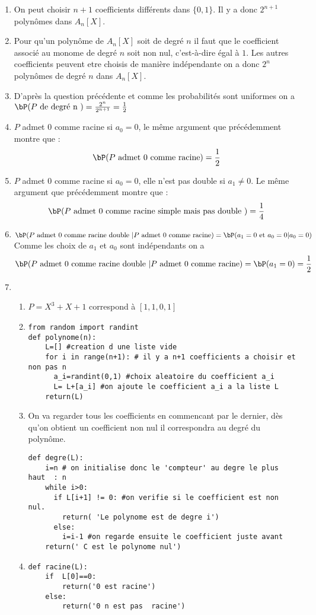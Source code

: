 \begin{correction}
\begin{enumerate}
\item On peut choisir $n+1$ coefficients différents dans $\{0,1\}$. Il y a donc $2^{n+1}$ polynômes dans $A_n[X]$. 
\item Pour qu'un polynôme de $A_n[X]$ soit de degré $n$ il faut que le coefficient associé au monome de degré $n$ soit non nul, c'est-à-dire égal à $1$. Les autres coefficients peuvent etre choisis de manière indépendante on a donc $2^n$  polynômes de degré $n$ dans $A_n[X]$. 
\item D'après la question précédente et comme les probabilités sont uniformes on a $\bP( \text{$ P$ de degré n }) =\frac{2^n}{2^{n+1}} =\frac{1}{2}$
\item $P$ admet $0$ comme racine si $a_0=0$, le même argument que précédemment montre que :
$$\bP( \text{$ P$ admet 0 comme racine}) = \frac{1}{2}$$

\item $P$ admet $0$ comme racine si $a_0=0$, elle n'est pas double si $a_1\neq 0$. Le même argument que précédemment montre que :
$$\bP( \text{$ P$ admet 0 comme racine simple mais pas double }) = \frac{1}{4}$$
\item $\bP( \text{$ P$ admet 0 comme racine  double } | \text{$ P$ admet 0 comme racine}  )  = \bP (a_1= 0 \text{ et } a_0 =0 | a_0 =0 ) $ Comme les choix de $a_1$ et $a_0$ sont indépendants on a 
$$\bP( \text{$ P$ admet 0 comme racine  double } | \text{$ P$ admet 0 comme racine}  )   =\bP (a_1= 0 ) =\frac{1}{2}$$
\item 
\begin{enumerate}
\item $P=X^3+X+1$ correspond à $[1,1,0,1]$
\item 
\begin{lstlisting}
from random import randint
def polynome(n):
	L=[] #creation d une liste vide
	for i in range(n+1): # il y a n+1 coefficients a choisir et non pas n 
	  a_i=randint(0,1) #choix aleatoire du coefficient a_i
	  L= L+[a_i] #on ajoute le coefficient a_i a la liste L
	return(L)		  
\end{lstlisting}
\item 
On va regarder tous les coefficients en commencant par le dernier, dès qu'on obtient un coefficient non nul il correspondra au degré du polynôme. 
\begin{lstlisting}
def degre(L):
	i=n # on initialise donc le 'compteur' au degre le plus haut  : n 
	while i>0:
	  if L[i+1] != 0: #on verifie si le coefficient est non nul. 
	  	return( 'Le polynome est de degre i')
	  else:
	    i=i-1 #on regarde ensuite le coefficient juste avant 
	return(' C est le polynome nul')
\end{lstlisting}

\item 
\begin{lstlisting}
def racine(L):
	if  L[0]==0:
		return('0 est racine')
	else: 
		return('0 n est pas  racine')
\end{lstlisting}
\end{enumerate}
\end{enumerate}
\end{correction}